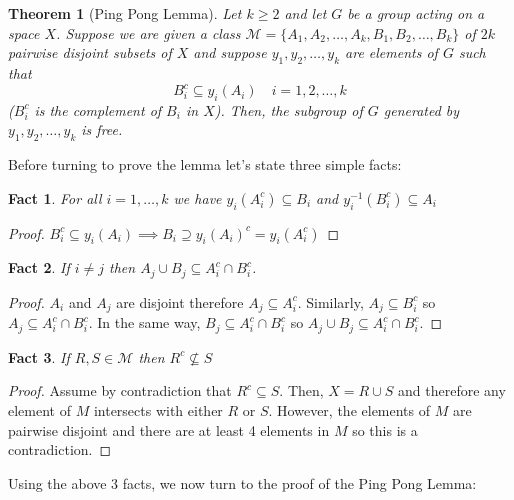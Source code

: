 \documentclass[12pt]{article}
\newtheorem*{theorem}{Theorem}
\newtheorem{fact}{Fact}
\begin{document}
\begin{theorem}[Ping Pong Lemma]
Let $k\geq2$ and let $G$ be a group acting on a space $X$. Suppose
we are given a class
$\mathcal{M}=\{A_1,A_2,\ldots,A_k,B_1,B_2,\ldots,B_k\}$ of $2k$
pairwise disjoint subsets of $X$ and suppose $y_1,y_2,\ldots,y_k$
are elements of $G$ such that
\[
B_i^c \subseteq y_i(A_i)\quad i=1,2,\ldots,k
\]
($B_i^c$ is the complement of $B_i$ in $X$). Then, the subgroup
of $G$ generated by $y_1,y_2,\ldots,y_k$ is free.
\end{theorem}


\noindent Before turning to prove the lemma let's state three
simple facts:
\begin{fact} \label{fct1}
For all $i=1,\ldots,k$ we have $y_i(A_i^c)\subseteq B_i$ and
$y_i^{-1}(B_i^c)\subseteq A_i$
\end{fact}
\begin{proof}
$B_i^c \subseteq y_i(A_i) \implies B_i \supseteq y_i(A_i)^c =
y_i(A_i^c)$
\end{proof}
\begin{fact} \label{fct2}
If $i\neq j$ then $A_j\cup B_j \subseteq A_i^c\cap B_i^c$.
\end{fact}
\begin{proof}
$A_i$ and $A_j$ are disjoint therefore $A_j\subseteq A_i^c$.
Similarly, $A_j\subseteq B_i^c$ so $A_j\subseteq A_i^c\cap B_i^c$.
In the same way, $B_j\subseteq A_i^c\cap B_i^c$ so $A_j\cup B_j
\subseteq A_i^c\cap B_i^c$.
\end{proof}

\begin{fact} \label{fct3}
If $R,S\in\mathcal{M}$ then $R^c\not\subseteq S$
\end{fact}
\begin{proof}
Assume by contradiction that $R^c\subseteq S$. Then, $X=R\cup
S$ and therefore any element of $M$ intersects with either $R$ or
$S$. However, the elements of $M$ are pairwise disjoint and there
are at least 4 elements in $M$ so this is a contradiction.
\end{proof}

\bigskip

Using the above 3 facts, we now turn to the proof of the Ping Pong Lemma:
\end{document}
